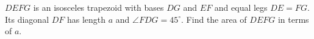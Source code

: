 $DEFG$ is an isosceles trapezoid with bases $DG$ and $EF$ and equal legs $DE=FG$. Its diagonal $DF$ has length $a$ and $\angle FDG=45^\circ$. Find the area of $DEFG$ in terms of $a$.

